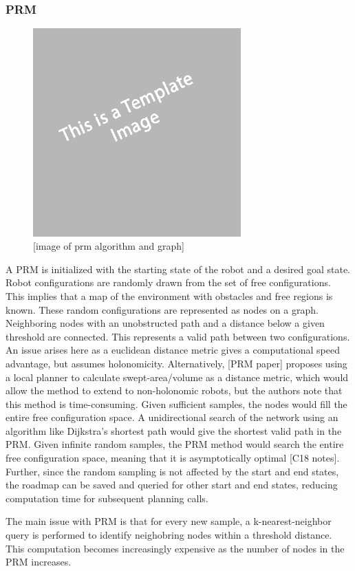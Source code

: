 \documentclass[12pt]{article}
\begin{document}
        \subsubsection{PRM}
            \begin{figure}[ht]
                \includegraphics[width=8cm]{temp}
                \centering
                \caption{[image of prm algorithm and graph]}
            \end{figure}
            A PRM is initialized with the starting state of the robot and a desired goal state. Robot configurations are randomly drawn from the set of free configurations. This implies that a map of the environment with obstacles and free regions is known. These random configurations are represented as nodes on a graph. Neighboring nodes with an unobstructed path and a distance below a given threshold are connected. This represents a valid path between two configurations. An issue arises here as a euclidean distance metric gives a computational speed advantage, but assumes holonomicity. Alternatively, [PRM paper] proposes using a local planner to calculate swept-area/volume as a distance metric, which would allow the method to extend to non-holonomic robots, but the authors note that this method is time-consuming. Given sufficient samples, the nodes would fill the entire free configuration space. A unidirectional search of the network using an algorithm like Dijkstra's shortest path would give the shortest valid path in the PRM. Given infinite random samples, the PRM method would search the entire free configuration space, meaning that it is asymptotically optimal [C18 notes]. Further, since the random sampling is not affected by the start and end states, the roadmap can be saved and queried for other start and end states, reducing computation time for subsequent planning calls. 
            \par The main issue with PRM is that for every new sample, a k-nearest-neighbor query is performed to identify neighobring nodes within a threshold distance. This computation becomes increasingly expensive as the number of nodes in the PRM increases. 
        \fi
\end{document}
